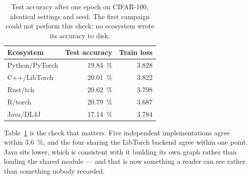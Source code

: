 \begin{table}[t]
\centering
\caption{Test accuracy after one epoch on CIFAR-100, identical settings and seed.
The first campaign could not perform this check: no ecosystem wrote its accuracy
to disk.}
\label{tab:convergence}
\small
\begin{tabular}{lrr}
\toprule
Ecosystem & Test accuracy & Train loss \\
\midrule
Python/PyTorch & \SI{19.84}{\percent} & 3.828 \\
C++/LibTorch   & \SI{20.01}{\percent} & 3.822 \\
Rust/tch       & \SI{20.62}{\percent} & 3.798 \\
R/torch        & \SI{20.79}{\percent} & 3.687 \\
Java/DL4J      & \SI{17.14}{\percent} & 3.784 \\
\bottomrule
\end{tabular}
\end{table}

Table~\ref{tab:convergence} is the check that matters. Five independent
implementations agree within \SI{3.6}{\percent}, and the four sharing the
LibTorch backend agree within one point. Java sits lower, which is consistent
with it building its own graph rather than loading the shared module --- and
that is now something a reader can see rather than something nobody recorded.
